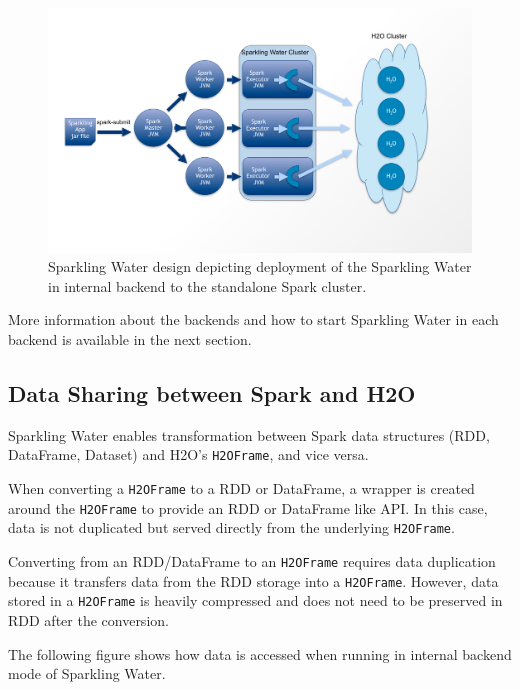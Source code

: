 \documentclass{standalone}
\begin{document}
    \begin{figure}[h!]
        \centering
        \includegraphics[scale=0.4]{../images/Topology-external.png}
        \caption{Sparkling Water design depicting deployment of the Sparkling Water in internal backend to the standalone Spark cluster.}
    \end{figure}

    More information about the backends and how to start Sparkling Water in each backend is available in the next section.

    \subsection{Data Sharing between Spark and H2O}

    Sparkling Water enables transformation between Spark data structures (RDD, DataFrame, Dataset) and H2O's
    \texttt{H2OFrame}, and vice versa.

    When converting a \texttt{H2OFrame} to a RDD or DataFrame, a wrapper is created around the \texttt{H2OFrame} to provide
    an RDD or DataFrame like API. In this case, data is not duplicated but served directly from the underlying \texttt{H2OFrame}.

    Converting from an RDD/DataFrame to an \texttt{H2OFrame} requires data duplication because it transfers
    data from the RDD storage into a \texttt{H2OFrame}. However, data stored in a \texttt{H2OFrame} is heavily compressed
    and does not need to be preserved in RDD after the conversion.

    The following figure shows how data is accessed when running in internal backend mode of Sparkling Water.
\end{document}
